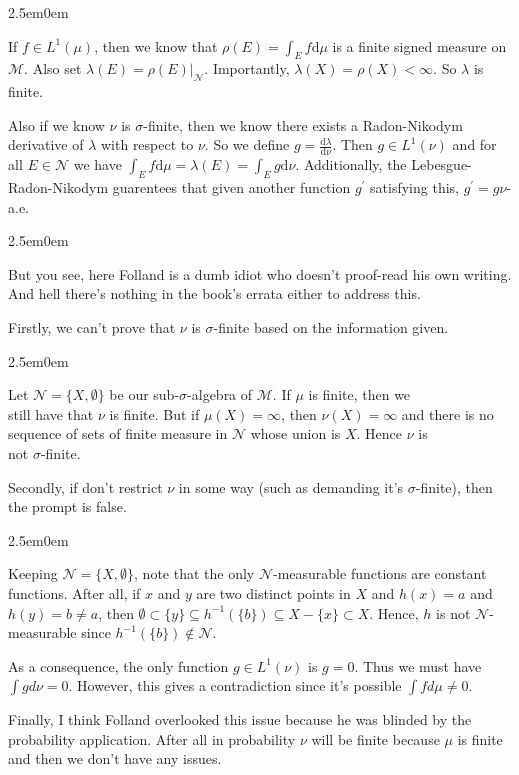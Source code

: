 \documentclass{book}
\newcommand{\exTwoP}{%
   \color{RedViolet}%
   \fontsize{13}{15}\selectfont%
}
\newcommand{\exPPP}{%
   \color{VioletRed}%
   \fontsize{12}{14}\selectfont%
}
\newenvironment{myIndent}{%
   \begin{adjustwidth}{2.5em}{0em}%
}{%
   \end{adjustwidth}%
}
\newcommand{\df}{\mathrm{d}}
\newcommand{\retTwo}{\hfill\bigbreak}
\begin{document}
\begin{myIndent}\exTwoP
	If $f \in L^1(\mu)$, then we know that $\rho(E) = \int_E f \df \mu$ is a finite signed measure on $\mathcal{M}$. Also set $\lambda(E) = \rho(E)|_{\mathcal{N}}$. Importantly, $\lambda(X) = \rho(X) < \infty$. So $\lambda$ is finite.\newpage

	Also if we know $\nu$ is $\sigma$-finite, then we know there exists a Radon-Nikodym derivative of $\lambda$ with respect to $\nu$. So we define $g = \frac{\df \lambda}{\df \nu}$. Then $g \in L^1(\nu)$ and for all $E \in \mathcal{N}$ we have $\int_E f\df\mu = \lambda(E) = \int_E g\df\nu$. Additionally, the Lebesgue-Radon-Nikodym guarentees that given another function $g^\prime$ satisfying this, $g^\prime = g$\phantom{..}$\nu$-a.e.\retTwo
	
	\begin{myIndent}\exPPP
		But you see, here Folland is a dumb idiot who doesn't proof-read his own writing. And hell there's nothing in the book's errata either to address this.\retTwo

		Firstly, we can't prove that $\nu$ is $\sigma$-finite based on the information given.
		\begin{myIndent}
			Let $\mathcal{N} = \{X, \emptyset\}$ be our sub-$\sigma$-algebra of $\mathcal{M}$. If $\mu$ is finite, then we\\ still have that $\nu$ is finite. But if $\mu(X) = \infty$, then $\nu(X) = \infty$ and there is no\\ sequence of sets of finite measure in $\mathcal{N}$ whose union is $X$. Hence $\nu$ is\\ not $\sigma$-finite.\retTwo
		\end{myIndent}

		Secondly, if don't restrict $\nu$ in some way (such as demanding it's $\sigma$-finite), then the prompt is false.
		\begin{myIndent}
			Keeping $\mathcal{N} = \{X, \emptyset\}$, note that the only $\mathcal{N}$-measurable functions are constant functions. After all, if $x$ and $y$ are two distinct points in $X$ and $h(x) = a$ and\\ $h(y) = b \neq a$, then $\emptyset \subset \{y\} \subseteq h^{-1}(\{b\}) \subseteq X - \{x\} \subset X$. Hence, $h$ is not $\mathcal{N}$-measurable since $h^{-1}(\{b\}) \notin \mathcal{N}$.\retTwo

			As a consequence, the only function $g \in L^1(\nu)$ is $g = 0$. Thus we must have $\int g d\nu = 0$. However, this gives a contradiction since it's possible $\int f d\mu \neq 0$.\retTwo
		\end{myIndent}

		Finally, I think Folland overlooked this issue because he was blinded by the\\ probability application. After all in probability $\nu$ will be finite because $\mu$ is finite\\ and then we don't have any issues.\retTwo
	\end{myIndent}
\end{myIndent}
\end{document}

